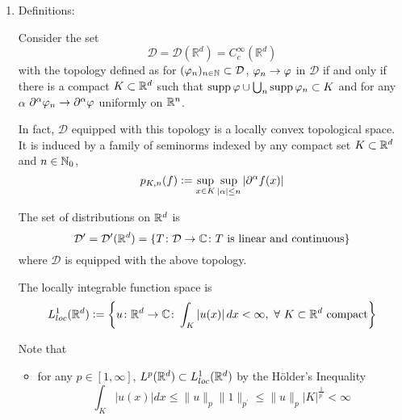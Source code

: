 \begin{enumerate}[label=\arabic*.]
	\item Definitions: 
	\begin{defn}
		Consider the set
		\begin{equation*}
			\mathcal{D}=\mathcal{D}\left(\mathbb{R}^d\right)=C_c^{\infty}\left(\mathbb{R}^d\right)
		\end{equation*}
		with the topology defined as for $(\varphi_n)_{n \in \mathbb{N}} \subset \mathcal{D}$, $\varphi_n \rightarrow \varphi$ in $\mathcal{D}$ if and only if there is a compact $K \subset \mathbb{R}^d$ such that $\operatorname{supp} \varphi \cup \bigcup_n \operatorname{supp} \varphi_n \subset K$ and for any $\alpha$ $\partial^\alpha \varphi_n \rightarrow \partial^\alpha \varphi$ uniformly on $\mathbb{R}^n$. 
	\end{defn}
	\begin{rmk}
		In fact, $\mathcal{D}$ equipped with this topology is a locally convex topological space. It is induced by a family of seminorms indexed by any compact set $K \subset \mathbb{R}^d$ and $n \in \mathbb{N}_0$,
		\begin{equation*}
			p_{K,n}(f) \vcentcolon= \sup_{x \in K} \sup_{\left\lvert\alpha\right\lvert \leq n} \left\lvert\partial^\alpha f(x)\right\lvert
		\end{equation*}
	\end{rmk}

	\begin{defn}
		The set of distributions on $\mathbb{R}^d$ is
		\begin{equation*}
			\mathcal{D}^\prime = \mathcal{D}^\prime(\mathbb{R}^d) = \left\{T \colon \mathcal{D} \rightarrow \mathbb{C} \colon T \text{ is linear and continuous}\right\}
		\end{equation*}
		where $\mathcal{D}$ is equipped with the above topology.
	\end{defn}

	\begin{exam}
		\begin{defn}
			The locally integrable function space is
			\begin{equation*}
				L^1_{loc}(\mathbb{R}^d) \vcentcolon= \left\{u \colon \mathbb{R}^d \rightarrow \mathbb{C} \colon \int_K \left\lvert u(x)\right\lvert dx < \infty,~\forall~K \subset \mathbb{R}^d \text{ compact}\right\}
			\end{equation*}
		\end{defn}
		Note that
		\begin{itemize}
			\item for any $p \in [1,\infty]$, $L^p(\mathbb{R}^d) \subset L^1_{loc}(\mathbb{R}^d)$ by the H\"older's Inequality
			\begin{equation*}
				\int_K|u(x)| d x \leq\|u\|_{p}\|1\|_{p^\prime} \leq\|u\|_{p}|K|^{\frac{1}{p^{\prime}}}<\infty
			\end{equation*}


\end{itemize}
\end{exam}
\end{enumerate}
